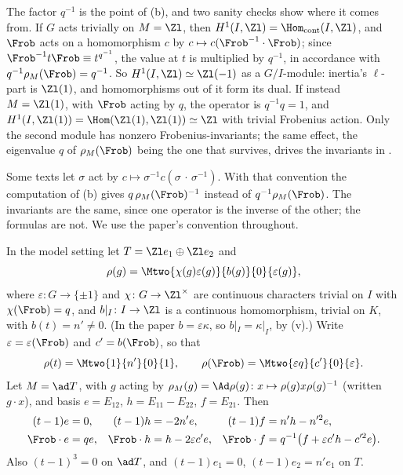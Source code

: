 The factor $q^{-1}$ is the point of (b), and two sanity checks show where it comes from. If $G$ acts trivially on $M=\Zl$, then $H^1(I,\Zl)=\Hom_{\mathrm{cont}}(I,\Zl)$,
and $\Frob$ acts on a homomorphism $c$ by $c\mapsto c(\Frob^{-1}\cdot\Frob)$; since $\Frob^{-1}t\Frob\equiv t^{q^{-1}}$, the value at $t$ is multiplied by $q^{-1}$, in
accordance with $q^{-1}\rho_M(\Frob)=q^{-1}$. So $H^1(I,\Zl)\simeq\Zl(-1)$ as a $G/I$-module: inertia's $\ell$-part is $\Zl(1)$, and homomorphisms out of it form its
dual. If instead $M=\Zl(1)$, with $\Frob$ acting by $q$, the operator is $q^{-1}q=1$, and $H^1(I,\Zl(1))=\Hom(\Zl(1),\Zl(1))\simeq\Zl$ with trivial Frobenius action. Only
the second module has nonzero Frobenius-invariants; the same effect, the eigenvalue $q$ of $\rho_M(\Frob)$ being the one that survives, drives the invariants
in .

\begin{remark}\label{rem:cohomology:other-convention}
Some texts let $\sigma$ act by $c\mapsto\sigma^{-1}c(\sigma\,\cdot\,\sigma^{-1})$. With that convention the computation of (b) gives $q\,\rho_M(\Frob)^{-1}$ instead of $q^{-1}\rho_M(\Frob)$.
The invariants are the same, since one operator is the inverse of the other; the formulas are not. We use the paper's convention throughout.
\end{remark}

\begin{lemma}\label{lem:cohomology:tate-shape}
In the model setting let $T=\Zl e_1\oplus\Zl e_2$ and
\[
\rho(g)=\Mtwo{\chi(g)\varepsilon(g)}{b(g)}{0}{\varepsilon(g)},
\]
where $\varepsilon\colon G\to\{\pm1\}$ and $\chi\colon G\to\Zl^\times$ are continuous characters trivial on $I$ with $\chi(\Frob)=q$, and $b|_I\colon I\to\Zl$ is a
continuous homomorphism, trivial on $K$, with $b(t)=n'\ne0$. (In the paper $b=\varepsilon\kappa$, so $b|_I=\kappa|_I$, by (v).) Write
$\varepsilon=\varepsilon(\Frob)$ and $c'=b(\Frob)$, so that
\[
\rho(t)=\Mtwo{1}{n'}{0}{1},\qquad \rho(\Frob)=\Mtwo{\varepsilon q}{c'}{0}{\varepsilon}.
\]
Let $M=\ad T$, with $g$ acting by $\rho_M(g)=\Ad\rho(g)\colon x\mapsto\rho(g)x\rho(g)^{-1}$ (written $g\cdot x$), and basis $e=E_{12}$, $h=E_{11}-E_{22}$, $f=E_{21}$. Then
\begin{align*}
(t-1)e&=0, & (t-1)h&=-2n'e, & (t-1)f&=n'h-n'^2e,\\
\Frob\cdot e&=qe, & \Frob\cdot h&=h-2\varepsilon c'e, & \Frob\cdot f&=q^{-1}\bigl(f+\varepsilon c'h-c'^2e\bigr).
\end{align*}
Also $(t-1)^3=0$ on $\ad T$, and $(t-1)e_1=0$, $(t-1)e_2=n'e_1$ on $T$.
\end{lemma}

